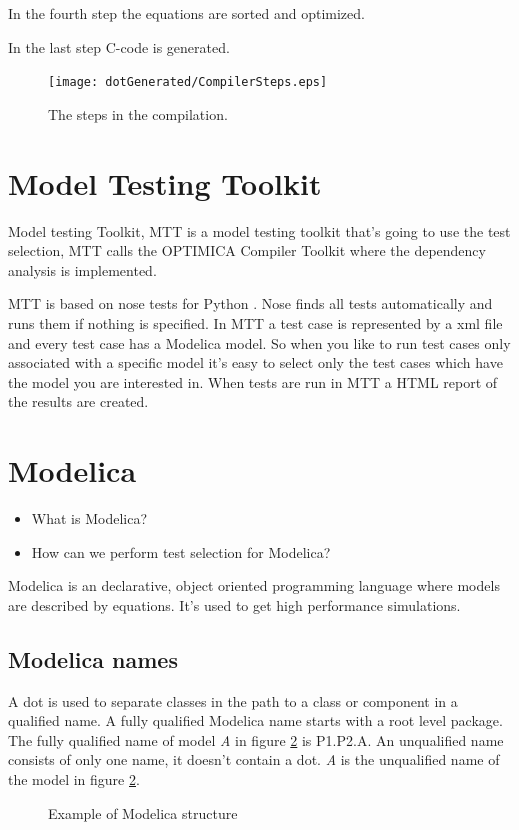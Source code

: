 \documentclass{cslthse-msc}
\begin{document}
In the fourth step the equations are sorted and optimized.

In the last step C-code is generated.\cite{aakesson2010implementation}

\begin{figure}[!htbp]
    \centering
    {\texttt{[image: dotGenerated/CompilerSteps.eps]}}
    \caption{The steps in the compilation.}
    \label{fig:compilerSteps}
\end{figure}



\section{Model Testing Toolkit}
Model testing Toolkit, MTT is a model testing toolkit that's going to use the test selection, MTT calls the OPTIMICA Compiler Toolkit where the dependency analysis is implemented.

MTT is based on nose tests for Python \cite{noseDoc}. Nose finds all tests automatically and runs them if nothing is specified. In MTT a test case is represented by a xml file and every test case has a Modelica model. So when you like to run test cases only associated with a specific model it's easy to select only the test cases which have the model you are interested in. When tests are run in MTT a HTML report of the results are created.

\section{Modelica}
\begin{itemize}
	\item What is Modelica?
	\item How can we perform test selection for Modelica?
	\end{itemize}

Modelica is an declarative, object oriented programming language where models are described by equations. It's used to get high performance simulations.

\subsection{Modelica names}
A dot is used to separate classes in the path to a class or component in a qualified name. A fully qualified Modelica name starts with a root level package. The fully qualified name of model \textit{A} in figure \ref{fig:modelicaExample} is P1.P2.A. An unqualified name consists of only one name, it doesn't contain a dot. \textit{A} is the unqualified name of the model in figure \ref{fig:modelicaExample}.
\begin{figure}[!htbp]
    \centering
    \qquad
    \subfloat{\raisebox{3.2 cm}{}}
    \caption{Example of Modelica structure}
    \label{fig:modelicaExample}
\end{figure}
\end{document}
